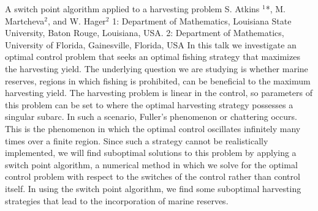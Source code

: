 \vspace{1.5ex}
\abs
{A switch point algorithm applied to a harvesting problem}
{S. Atkins {$^{1}$*},  M. Martcheva{$^{2}$}, and W. Hager{$^{2}$}}
{1: Department of Mathematics, Louisiana State University, Baton Rouge, Louisiana, USA. 2: Department of Mathematics, University of Florida, Gainesville, Florida, USA}
{In this talk we investigate an optimal control problem that seeks an optimal fishing strategy that maximizes the harvesting yield. The underlying question we are studying is whether marine reserves, regions in which fishing is prohibited, can be beneficial to the maximum harvesting yield. The harvesting problem is linear in the control, so parameters of this problem can be set to where the optimal harvesting strategy possesses a singular subarc. In such a scenario, Fuller’s phenomenon or chattering occurs. This is the phenomenon in which the optimal control oscillates infinitely many times over a finite region. Since such a strategy cannot be realistically implemented, we will find suboptimal solutions to this problem by applying a switch point algorithm, a numerical method in which we solve for the optimal control problem with respect to the switches of the control rather than control itself. In using the switch point algorithm, we find some suboptimal harvesting strategies that lead to the incorporation of marine reserves.}





